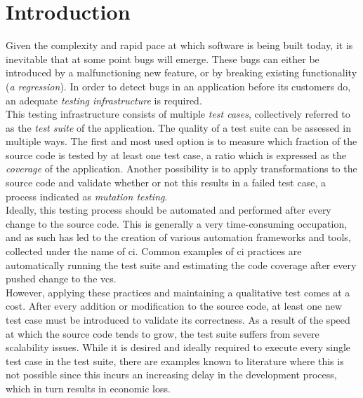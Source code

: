 
\chapter{Introduction}
\label{ch:introduction}
Given the complexity and rapid pace at which software is being built today, it is inevitable that at some point bugs will emerge. These bugs can either be introduced by a malfunctioning new feature, or by breaking existing functionality (\emph{a regression}). In order to detect bugs in an application before its customers do, an adequate \emph{testing infrastructure} is required.\\

\noindent This testing infrastructure consists of multiple \emph{test cases}, collectively referred to as the \emph{test suite} of the application. The quality of a test suite can be assessed in multiple ways. The first and most used option is to measure which fraction of the source code is tested by at least one test case, a ratio which is expressed as the \emph{coverage} of the application. Another possibility is to apply transformations to the source code and validate whether or not this results in a failed test case, a process indicated as \emph{mutation testing}.\\

\noindent Ideally, this testing process should be automated and performed after every change to the source code. This is generally a very time-consuming occupation, and as such has led to the creation of various automation frameworks and tools, collected under the name of \acrfull{ci}. Common examples of \acrshort{ci} practices are automatically running the test suite and estimating the code coverage after every pushed change to the \acrfull{vcs}.\\

\noindent However, applying these practices and maintaining a qualitative test comes at a cost. After every addition or modification to the source code, at least one new test case must be introduced to validate its correctness. As a result of the speed at which the source code tends to grow, the test suite suffers from severe scalability issues. While it is desired and ideally required to execute every single test case in the test suite, there are examples known to literature where this is not possible since this incurs an increasing delay in the development process, which in turn results in economic loss.\\


